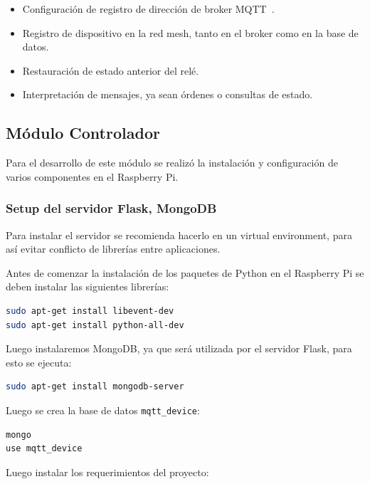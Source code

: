\begin{itemize}
  \item Configuración de registro de dirección de broker MQTT~.
  \item Registro de dispositivo en la red mesh, tanto en el broker como en la base de datos.~
  \item Restauración de estado anterior del relé.
  \item Interpretación de mensajes, ya sean órdenes o consultas de estado.
\end{itemize}


\subsection{Módulo Controlador}

Para el desarrollo de este módulo se realizó la instalación y configuración de varios componentes en el Raspberry Pi.

\subsubsection{Setup del servidor Flask, MongoDB} \label{flask-mongo-conf}

Para instalar el servidor se recomienda hacerlo en un virtual environment, para así evitar conflicto de librerías entre aplicaciones.

Antes de comenzar la instalación de los paquetes de Python en el Raspberry Pi se deben instalar las siguientes librerías:

\begin{lstlisting}[language=bash]
sudo apt-get install libevent-dev
sudo apt-get install python-all-dev
\end{lstlisting}

Luego instalaremos MongoDB, ya que será utilizada por el servidor Flask, para esto se ejecuta:

\begin{lstlisting}[language=bash]
sudo apt-get install mongodb-server
\end{lstlisting}

Luego se crea la base de datos \lstinline[columns=fixed]{mqtt_device}:

\begin{lstlisting}[language=bash]
mongo
use mqtt_device
\end{lstlisting}

Luego instalar los requerimientos del proyecto:

